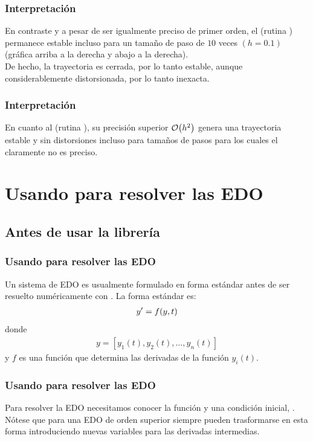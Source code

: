 \begin{frame}
\frametitle{Interpretación}
En contraste y a pesar de ser igualmente preciso de primer orden, el  (rutina ) permanece estable incluso para un tamaño de paso de $10$ veces $(h = 0.1)$ (gráfica arriba a la derecha y abajo a la derecha).
\\
\bigskip
De hecho, la trayectoria es cerrada, por lo tanto estable, aunque considerablemente distorsionada, por lo tanto inexacta.
\end{frame}
\begin{frame}
\frametitle{Interpretación}
En cuanto al  (rutina ), su precisión superior $\order{h^{2}}$ genera una trayectoria estable y sin distorsiones incluso para tamaños de pasos para los cuales el  claramente no es preciso.
\end{frame}
\section{Usando \python{} para resolver las EDO}
\subsection{Antes de usar la librería}
\begin{frame}
\frametitle{Usando \python{} para resolver las EDO}
Un sistema de EDO es usualmente formulado en forma estándar antes de ser resuelto numéricamente con \python. La forma estándar es:
\begin{align*}
{y}^{\prime} = f(y, t)
\end{align*}
donde
\begin{align*}
y = [y_{1}(t), y_{2}(t), \ldots, y _{n}(t)]
\end{align*}
y $f$ es una función que determina las derivadas de la función $y_{i}(t)$.
\end{frame}
\begin{frame}
\frametitle{Usando \python{} para resolver las EDO}
Para resolver la EDO necesitamos conocer la función  y una condición inicial, .
\\
\medskip
Nótese que para una EDO de orden superior siempre pueden trasformarse en esta forma introduciendo nuevas variables para las derivadas intermedias.
\end{frame}
